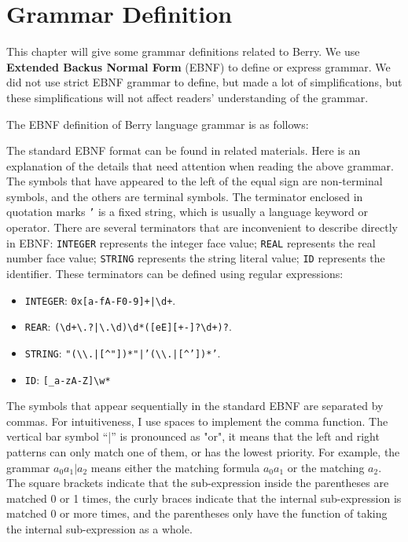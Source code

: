 \chapter {Grammar Definition}

This chapter will give some grammar definitions related to Berry. We use \textbf{Extended Backus Normal Form} (EBNF) to define or express grammar. We did not use strict EBNF grammar to define, but made a lot of simplifications, but these simplifications will not affect readers' understanding of the grammar.

The EBNF definition of Berry language grammar is as follows:



The standard EBNF format can be found in related materials. Here is an explanation of the details that need attention when reading the above grammar. The symbols that have appeared to the left of the equal sign are non-terminal symbols, and the others are terminal symbols. The terminator enclosed in quotation marks \texttt{'} is a fixed string, which is usually a language keyword or operator. There are several terminators that are inconvenient to describe directly in EBNF: \texttt{INTEGER} represents the integer face value; \texttt{REAL} represents the real number face value; \texttt{STRING} represents the string literal value; \texttt{ID} represents the identifier. These terminators can be defined using regular expressions:

\begin{itemize}
    \item \texttt{INTEGER}: \texttt{0x[a-fA-F0-9]+|\textbackslash d+}.
    \item \texttt{REAR}: \texttt{(\textbackslash d+\textbackslash.?|\textbackslash.\textbackslash d)\textbackslash d*([eE][+-]?\textbackslash d+)?}.
    \item \texttt{STRING}: \texttt{"(\textbackslash\textbackslash.|[\textasciicircum"])*"|'(\textbackslash\textbackslash.|[\textasciicircum'])*'}.
    \item \texttt{ID}: \texttt{[\_a-zA-Z]\textbackslash w*}
\end{itemize}

The symbols that appear sequentially in the standard EBNF are separated by commas. For intuitiveness, I use spaces to implement the comma function. The vertical bar symbol ``|'' is pronounced as "or", it means that the left and right patterns can only match one of them, or has the lowest priority. For example, the grammar $a_0a_1|a_2$ means either the matching formula $a_0a_1$ or the matching $a_2$. The square brackets indicate that the sub-expression inside the parentheses are matched 0 or 1 times, the curly braces indicate that the internal sub-expression is matched 0 or more times, and the parentheses only have the function of taking the internal sub-expression as a whole.

